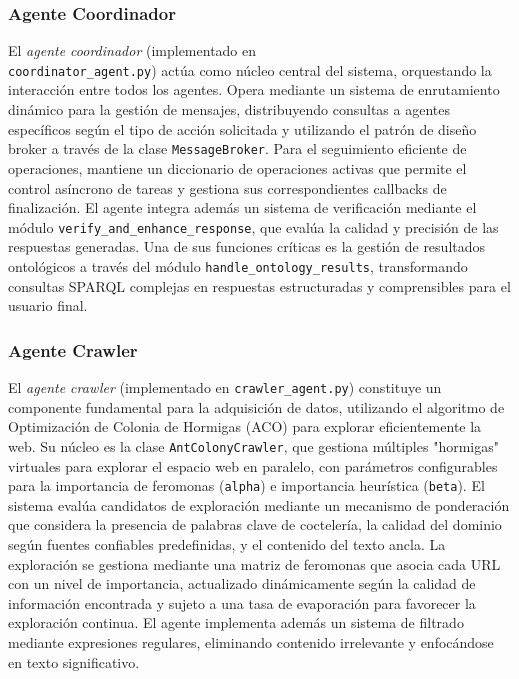 \documentclass[runningheads]{llncs}
\begin{document}
\subsubsection{Agente Coordinador}
El \textit{agente coordinador} (implementado en \\ \texttt{coordinator\_agent.py}) actúa como núcleo central del sistema, orquestando la interacción entre todos los agentes. Opera mediante un sistema de enrutamiento dinámico para la gestión de mensajes, distribuyendo consultas a agentes específicos según el tipo de acción solicitada y utilizando el patrón de diseño broker a través de la clase \texttt{MessageBroker}. Para el seguimiento eficiente de operaciones, mantiene un diccionario de operaciones activas que permite el control asíncrono de tareas y gestiona sus correspondientes callbacks de finalización. El agente integra además un sistema de verificación mediante el módulo \texttt{verify\_and\_enhance\_response}, que evalúa la calidad y precisión de las respuestas generadas. Una de sus funciones críticas es la gestión de resultados ontológicos a través del módulo \texttt{handle\_ontology\_results}, transformando consultas SPARQL complejas en respuestas estructuradas y comprensibles para el usuario final.

\subsubsection{Agente Crawler}
El \textit{agente crawler} (implementado en \texttt{crawler\_agent.py}) constituye un componente fundamental para la adquisición de datos, utilizando el algoritmo de Optimización de Colonia de Hormigas (ACO) \cite{aco_simple} para explorar eficientemente la web. Su núcleo es la clase \texttt{AntColonyCrawler}, que gestiona múltiples "hormigas" virtuales para explorar el espacio web en paralelo, con parámetros configurables para la importancia de feromonas (\texttt{alpha}) e importancia heurística (\texttt{beta}). El sistema evalúa candidatos de exploración mediante un mecanismo de ponderación que considera la presencia de palabras clave de coctelería, la calidad del dominio según fuentes confiables predefinidas, y el contenido del texto ancla. La exploración se gestiona mediante una matriz de feromonas que asocia cada URL con un nivel de importancia, actualizado dinámicamente según la calidad de información encontrada y sujeto a una tasa de evaporación para favorecer la exploración continua. El agente implementa además un sistema de filtrado mediante expresiones regulares, eliminando contenido irrelevante y enfocándose en texto significativo.
\end{document}
